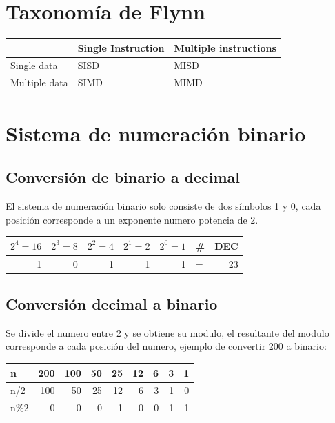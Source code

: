 \documentclass[11pt]{article}
\begin{document}
\section{Taxonomía de Flynn}
\label{sec:org69f832c}
\begin{center}
\begin{tabular}{|l|l|l|}
\hline
 & Single Instruction & Multiple instructions\\
\hline
Single data & SISD & MISD\\
\hline
Multiple data & SIMD & MIMD\\
\hline
\end{tabular}
\end{center}

\section{Sistema de numeración binario}
\label{sec:org73f3917}
\subsection{Conversión de binario a decimal}
\label{sec:org542ac2d}
El sistema de numeración binario solo consiste de dos símbolos 1 y 0, cada posición corresponde a un exponente numero potencia de 2.

\begin{center}
\begin{tabular}{|r|r|r|r|r|l|r|}
\hline
\(2^4=16\) & \(2^3=8\) & \(2^2=4\) & \(2^1=2\) & \(2^0=1\) & \# & DEC\\
\hline
1 & 0 & 1 & 1 & 1 & = & 23\\
\hline
\end{tabular}
\end{center}

\subsection{Conversión decimal a binario}
\label{sec:org86d680b}
Se divide el numero entre 2 y se obtiene su modulo, el resultante del modulo corresponde a cada posición del numero, ejemplo de convertir 200 a binario:

\begin{center}
\begin{tabular}{|l|r|r|r|r|r|r|r|r|}
\hline
n & 200 & 100 & 50 & 25 & 12 & 6 & 3 & 1\\
\hline
n/2 & 100 & 50 & 25 & 12 & 6 & 3 & 1 & 0\\
n\%2 & 0 & 0 & 0 & 1 & 0 & 0 & 1 & 1\\
\hline
\end{tabular}
\end{center}
\end{document}
